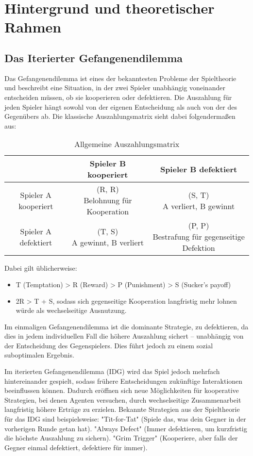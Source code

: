 \chapter{Hintergrund und theoretischer Rahmen}
\section{Das Iterierter Gefangenendilemma}
Das Gefangenendilemma ist eines der bekanntesten Probleme der Spieltheorie und 
beschreibt eine Situation, in der zwei Spieler unabhängig voneinander entscheiden 
müssen, ob sie kooperieren oder defektieren. Die Auszahlung für jeden Spieler hängt 
sowohl von der eigenen Entscheidung als auch von der des Gegenübers ab. 
Die klassische Auszahlungsmatrix sieht dabei folgendermaßen aus:

\begin{table}[h!]
    \centering
    \begin{tabular}{c|c|c}
            & Spieler B kooperiert & Spieler B defektiert\\
        \hline
        Spieler A kooperiert &  \makecell{(R, R) \\ Belohnung für Kooperation} & \makecell{(S, T) \\ A verliert, B gewinnt} \\
        \hline
        Spieler A defektiert &  \makecell{(T, S) \\ A gewinnt, B verliert} & \makecell{(P, P) \\ Bestrafung für gegenseitige Defektion} \\
    \end{tabular}
    \caption{Allgemeine Auszahlungsmatrix}
    \label{table:allgemeineauszahlungsmatrix}
\end{table}

Dabei gilt üblicherweise:
\begin{itemize}
    \item T (Temptation) > R (Reward) > P (Punishment) > S (Sucker's payoff)
    \item 2R > T + S, sodass sich gegenseitige Kooperation langfristig mehr lohnen würde als wechselseitige Ausnutzung.
\end{itemize}
Im einmaligen Gefangenendilemma ist die dominante Strategie, zu defektieren, da 
dies in jedem individuellen Fall die höhere Auszahlung sichert – unabhängig von der 
Entscheidung des Gegenspielers. Dies führt jedoch zu einem sozial suboptimalen 
Ergebnis.

Im iterierten Gefangenendilemma (IDG) wird das Spiel jedoch mehrfach hintereinander 
gespielt, sodass frühere Entscheidungen zukünftige Interaktionen beeinflussen können. 
Dadurch eröffnen sich neue Möglichkeiten für kooperative Strategien, bei denen 
Agenten versuchen, durch wechselseitige Zusammenarbeit langfristig höhere Erträge 
zu erzielen. Bekannte Strategien aus der Spieltheorie für das IDG sind beispielsweise:
"Tit-for-Tat" (Spiele das, was dein Gegner in der vorherigen Runde getan hat).
"Always Defect" (Immer defektieren, um kurzfristig die höchste Auszahlung zu sichern).
"Grim Trigger" (Kooperiere, aber falls der Gegner einmal defektiert, defektiere für immer).

